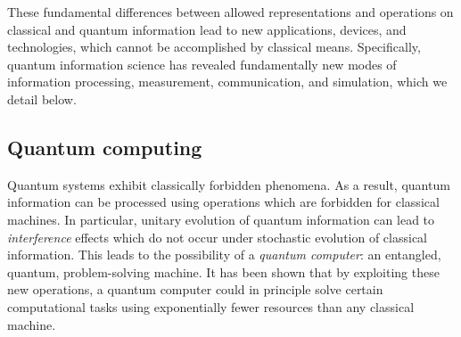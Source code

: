 These fundamental differences between allowed representations and operations on classical and quantum information lead to new applications, devices, and technologies, which cannot be accomplished by classical means. Specifically, quantum information science has revealed fundamentally new modes of information processing, measurement, communication, and simulation, which we detail below.

\subsection{Quantum computing} 
\label{sec:quantum-computing}
Quantum systems exhibit classically forbidden phenomena. As a result, quantum information can be processed using operations which are forbidden for classical machines.
In particular, unitary evolution of quantum information can lead to \emph{interference} effects which do not occur under stochastic evolution of classical information. 
This leads to the possibility of a \emph{quantum computer}: an entangled, quantum, problem-solving machine.
It has been shown that by exploiting these new operations, a quantum computer could in principle solve certain computational tasks using exponentially fewer resources than any classical machine. 

